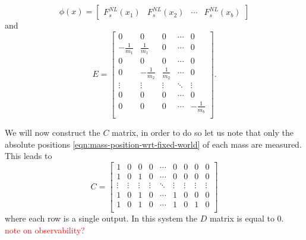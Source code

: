 \begin{equation}
    \phi(x) =
    \begin{bmatrix}
        F_s^{NL}(x_1) & F_s^{NL}(x_2) & \cdots & F_s^{NL}(x_b)
    \end{bmatrix}
\end{equation}
and
\begin{equation}
    E =
    \begin{bmatrix}
        0 & 0 & 0 & \cdots & 0 \\
        -\frac{1}{m_1} & \frac{1}{m_1} & 0 & \cdots & 0 \\
        0 & 0 & 0 & \cdots & 0 \\
        0 & -\frac{1}{m_2} & \frac{1}{m_2} & \cdots & 0 \\
        \vdots & \vdots & \vdots & \ddots & \vdots \\
        0 & 0 & 0 & \cdots & 0 \\
        0 & 0 & 0 & \cdots & -\frac{1}{m_b} \\
    \end{bmatrix}.
\end{equation}

We will now construct the $C$ matrix, in order to do so let us note that only the absolute positions \eqref{eqn:mass-position-wrt-fixed-world} of each mass are measured. This leads to
\begin{equation}\label{eqn:msd-C}
    C = 
    \begin{bmatrix}
        1 & 0 & 0 & 0 & \cdots & 0 & 0 & 0 & 0 \\
        1 & 0 & 1 & 0 & \cdots & 0 & 0 & 0 & 0 \\
        \vdots & \vdots & \vdots & \vdots & \ddots & \vdots & \vdots & \vdots & \vdots \\
        1 & 0 & 1 & 0 & \cdots & 1 & 0 & 0 & 0 \\
        1 & 0 & 1 & 0 & \cdots & 1 & 0 & 1 & 0 \\
    \end{bmatrix}
\end{equation}
where each row is a single output. In this system the $D$ matrix is equal to $0$.\\ 
\textcolor{red}{note on observability?}